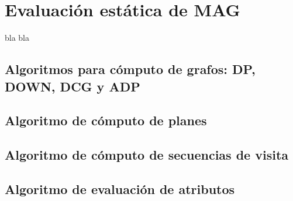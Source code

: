 \chapter{Evaluación estática de MAG}
\label{chap:eval_est}
\minitoc

bla bla

\section{Algoritmos para cómputo de grafos: DP, DOWN, DCG y ADP}





\section{Algoritmo de cómputo de planes}



\section{Algoritmo de cómputo de secuencias de visita}

\section{Algoritmo de evaluación de atributos}


